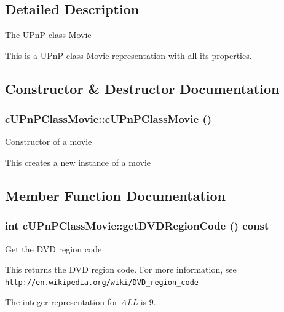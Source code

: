\subsection{Detailed Description}
The UPnP class Movie

This is a UPnP class Movie representation with all its properties. 

\subsection{Constructor \& Destructor Documentation}
\hypertarget{classcUPnPClassMovie_7343932df4e5bfd9821e16026cb7c66d}{
\subsubsection[{cUPnPClassMovie}]{\setlength{\rightskip}{0pt plus 5cm}cUPnPClassMovie::cUPnPClassMovie ()}}
\label{classcUPnPClassMovie_7343932df4e5bfd9821e16026cb7c66d}


Constructor of a movie

This creates a new instance of a movie 

\subsection{Member Function Documentation}
\hypertarget{classcUPnPClassMovie_80a41ba769974e80635b80aa3c41f66d}{
\subsubsection[{getDVDRegionCode}]{\setlength{\rightskip}{0pt plus 5cm}int cUPnPClassMovie::getDVDRegionCode () const}}
\label{classcUPnPClassMovie_80a41ba769974e80635b80aa3c41f66d}


Get the DVD region code

This returns the DVD region code. For more information, see \href{http://en.wikipedia.org/wiki/DVD_region_code}{\tt http://en.wikipedia.org/wiki/DVD\_\-region\_\-code}

The integer representation for {\em ALL\/} is 9.

